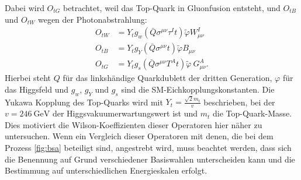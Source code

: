 Dabei wird $O_{tG}$ betrachtet, weil das Top-Quark in Gluonfusion entsteht, und $O_{tB}$ und $O_{tW}$ wegen der Photonabstrahlung:
\begin{align}
   O_{tW} &= Y_t g_w \left(\bar{Q}\sigma^{\mu\nu}\tau^{I} t \right) \tilde{\varphi} W^{I}_{\mu\nu}\\
   O_{tB} &= Y_t g_Y \left(\bar{Q}\sigma^{\mu\nu} t \right) \tilde{\varphi} B_{\mu\nu}\\
   O_{tG} &= Y_t g_s \left(\bar{Q}\sigma^{\mu\nu}T^A t\right)\tilde{\varphi}~ G^{A}_{\mu\nu}.
\end{align}
Hierbei steht $Q$ für das linkshändige Quarkdublett der dritten Generation, $\varphi$ für das Higgsfeld und $g_w$, $g_Y$ und $g_s$ sind die SM-Eichkopplungskonstanten. Die Yukawa Kopplung des Top-Quarks wird mit $Y_t = \frac{\sqrt{2}m_t}{v}$ beschrieben, bei der $v = \SI{246}{\giga\electronvolt}$ der Higgsvakuumerwartungswert ist und $m_t$ die Top-Quark-Masse.\\
Dies motiviert die Wilson-Koeffizienten dieser Operatoren hier näher zu untersuchen. Wenn ein Vergleich dieser Operatoren mit denen, die bei dem Prozess \ref{fig:bsa} beteiligt sind, angestrebt wird, muss beachtet werden, dass sich die Benennung auf Grund verschiedener Basiswahlen unterscheiden kann und die Bestimmung auf unterschiedlichen Energieskalen erfolgt.

